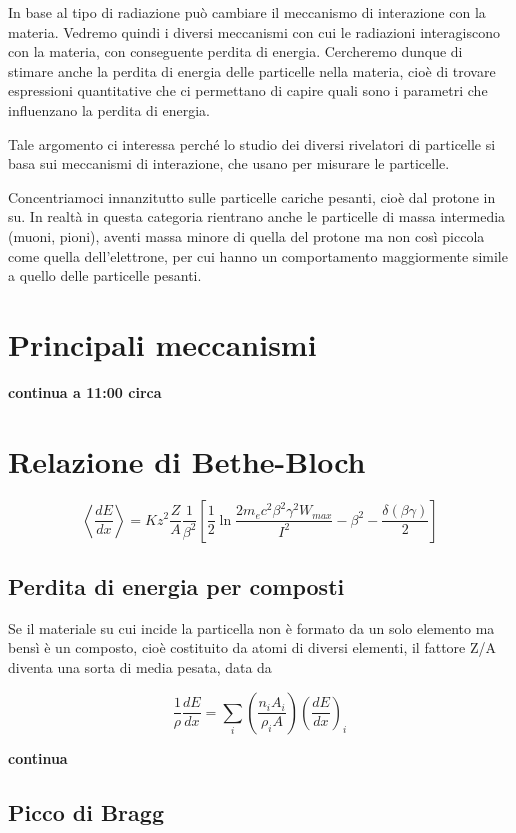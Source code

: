 In base al tipo di radiazione può cambiare il meccanismo di interazione con la materia. Vedremo quindi i diversi meccanismi con cui le radiazioni interagiscono con la materia, con conseguente perdita di energia. Cercheremo dunque di stimare anche la perdita di energia delle particelle nella materia, cioè di trovare espressioni quantitative che ci permettano di capire quali sono i parametri che influenzano la perdita di energia.

Tale argomento ci interessa perché lo studio dei diversi rivelatori di particelle si basa sui meccanismi di interazione, che usano per misurare le particelle.

Concentriamoci innanzitutto sulle particelle cariche pesanti, cioè dal protone in su. In realtà in questa categoria rientrano anche le particelle di massa intermedia (muoni, pioni), aventi massa minore di quella del protone ma non così piccola come quella dell'elettrone, per cui hanno un comportamento maggiormente simile a quello delle particelle pesanti.

\section{Principali meccanismi}

\textbf{continua a 11:00 circa}

\section{Relazione di Bethe-Bloch}

$$\left\langle\frac{dE}{dx}\right\rangle
=Kz^2\frac{Z}{A} \frac{1}{\beta^2}\left[\frac{1}{2}\ln{\frac{2m_e c^2 \beta^2 \gamma^2 W_{max}}{I^2}} - \beta^2 - \frac{\delta(\beta \gamma)}{2}\right]$$

\subsection{Perdita di energia per composti}

Se il materiale su cui incide la particella non è formato da un solo elemento ma bensì è un composto, cioè costituito da atomi di diversi elementi, il fattore Z/A diventa una sorta di media pesata, data da

$$\frac{1}{\rho} \frac{dE}{dx}
=\sum_i \left(\frac{n_i A_i}{\rho_i A}\right)\left(\frac{dE}{dx}\right)_i$$

\textbf{continua}

\subsection{Picco di Bragg}

